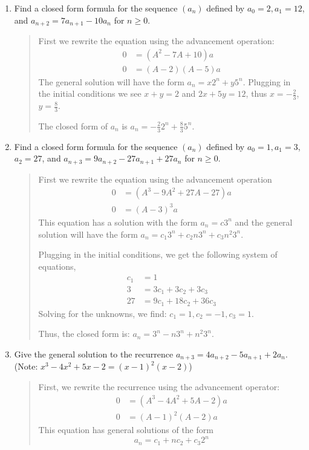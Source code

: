 \documentclass[letter]{article}
\newcommand{\setheader}[6]{
	\lhead{{\sc #1}\\{\sc #2} ({\small \it \today})}
	\rhead{
		{\bf #3} 
		\ifthenelse{\equal{#4}{}}{}{(#4)}\\
		{\bf #5} 
		\ifthenelse{\equal{#6}{}}{}{(#6)}%
	}
}
\begin{document}
	\setheader{MAT344}{Homework 9}{Luke Pereira}{}{}{}
	\begin{enumerate}
		\item 
		Find a closed form formula for the sequence $(a_n)$ defined by $a_0 = 2, a_1 = 12$, and $a_{n+2} = 7 a_{n+1} - 10a_n$ for $n \geq 0$.
		\begin{quote}
		    First we rewrite the equation using the advancement operation: 
		    \begin{align*}
		            0 &= (A^2 - 7A + 10)a  \\
		            0 &= (A - 2) (A - 5)a  
		    \end{align*} 
		    The general solution will have the form $a_n = x2^n + y 5^n$. Plugging in the initial conditions we see $x + y = 2$ and $2x + 5y = 12$, thus $x = -\frac{2}{3}$, $y = \frac{8}{3}$.
		    
		    The closed form of $a_n$ is $a_n = -\frac{2}{3}2^n + \frac{8}{3}5^n$.
		\end{quote}
        
        \newpage
        \item 
        Find a closed form formula for the sequence $(a_n)$ defined by $a_0 = 1, a_1 = 3$, $a_2 = 27$, and $a_{n+3} = 9a_{n+2} - 27a_{n+1} + 27a_n$ for $n \geq 0$.
		\begin{quote}
		    First we rewrite the equation using the advancement operation 
		    \begin{align*}
		        0 &= (A^3 -9A^2 +27A -27)a \\
		        0 &= (A-3)^3 a
		    \end{align*}
		    This equation has a solution with the form $a_n = c3^n$ and the general solution will have the form $a_n = c_1 3^n + c_2 n3^n + c_3 n^2 3^n$.
		    
		    Plugging in the initial conditions, we get the following system of equations, 
		        \begin{align*}
		            c_1 &= 1\\
		            3 &= 3c_1 + 3c_2 + 3c_3\\
		            27 &= 9c_1 + 18c_2 + 36c_3
		        \end{align*}
            Solving for the unknowns, we find: $c_1 = 1, c_2 = -1, c_3 = 1$.
		    
		    Thus, the closed form is: $a_n =  3^n - n3^n + n^2 3^n$.
		\end{quote}
		
		\newpage
        \item
        Give the general solution to the recurrence $a_{n+3} = 4a_{n+2} - 5a_{n+1} + 2a_n$. (Note: $x^3 - 4x^2 + 5x - 2 = (x - 1)^2(x - 2)$)
		\begin{quote}
		    First, we rewrite the recurrence using the advancement operator:
		    \begin{align*}
		        0 &= (A^3 - 4A^2 + 5A - 2)a\\
		        0 &= (A - 1)^2(A - 2)a
		    \end{align*}
		    This equation has general solutions of the form 
		    \[
    		    a_n = c_1 + n c_2 +  c_3 2^n
		    \]
		\end{quote}
		

\end{enumerate}
\end{document}
